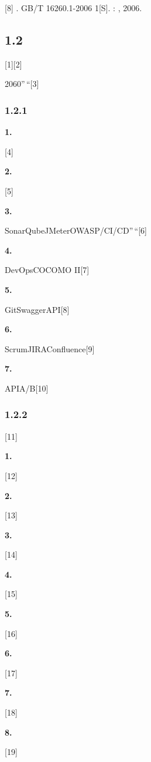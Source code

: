 {[}8{]} . GB/T 16260.1-2006 1{[}S{]}. : , 2006.

\subsection{1.2}\label{section-16}

{[}1{]}{[}2{]}

2060''\,``{[}3{]}

\subsubsection{1.2.1}\label{section-17}

\textbf{1. }

{[}4{]}

\textbf{2. }

{[}5{]}

\textbf{3. }

SonarQubeJMeterOWASP/CI/CD''\,``{[}6{]}

\textbf{4. }

DevOpsCOCOMO II{[}7{]}

\textbf{5. }

GitSwaggerAPI{[}8{]}

\textbf{6. }

ScrumJIRAConfluence{[}9{]}

\textbf{7. }

APIA/B{[}10{]}

\subsubsection{1.2.2}\label{section-18}

{[}11{]}

\textbf{1. }

{[}12{]}

\textbf{2. }

{[}13{]}

\textbf{3. }

{[}14{]}

\textbf{4. }

{[}15{]}

\textbf{5. }

{[}16{]}

\textbf{6. }

{[}17{]}

\textbf{7. }

{[}18{]}

\textbf{8. }

{[}19{]}

